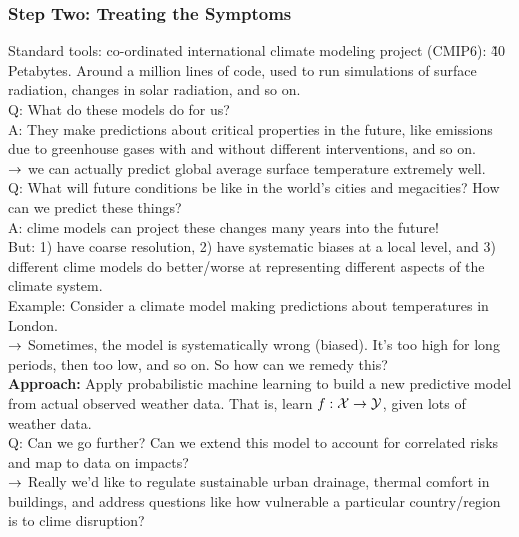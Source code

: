 \subsubsection{Step Two: Treating the Symptoms}

Standard tools: co-ordinated international climate modeling project (CMIP6): \~ 40 Petabytes. Around a million lines of code, used to run simulations of surface radiation, changes in solar radiation, and so on. \\

Q: What do these models do for us? \\

A: They make predictions about critical properties in the future, like emissions due to greenhouse gases with and without different interventions, and so on. \\

$\rightarrow$ we can actually predict global average surface temperature extremely well. \\

Q: What will future conditions be like in the world's cities and megacities? How can we predict these things? \\

A: clime models can project these changes many years into the future! \\

But: 1) have coarse resolution, 2) have systematic biases at a local level, and 3) different clime models do better/worse at representing different aspects of the climate system. \\

Example: Consider a climate model making predictions about temperatures in London. \\

$\rightarrow$ Sometimes, the model is systematically wrong (biased). It's too high for long periods, then too low, and so on. So how can we remedy this? \\

{\bf Approach:} Apply probabilistic machine learning to build a new predictive model from actual observed weather data. That is, learn $f : \mathcal{X} \rightarrow \mathcal{Y}$, given lots of weather data. \\

Q: Can we go further? Can we extend this model to account for correlated risks and map to data on impacts? \\

$\rightarrow$ Really we'd like to regulate sustainable urban drainage, thermal comfort in buildings, and address questions like how vulnerable a particular country/region is to clime disruption? \\

